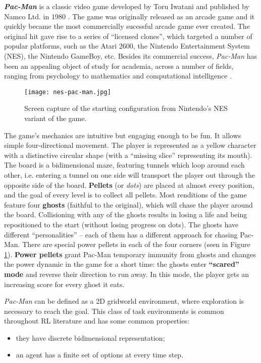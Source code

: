 \textbf{\textit{Pac-Man}} is a classic video game developed by Toru Iwatani and published by Namco Ltd. in 1980 \cite{pacman-in-academia}.
The game was originally released as an arcade game and it quickly became the most commercially sucessful arcade game ever created.
The original hit gave rise to a series of ``licensed clones'', which targeted a number of popular platforms, such as the Atari 2600, the Nintendo Entertainment System (NES), the Nintendo GameBoy, etc.
Besides its commercial success, \emph{Pac-Man} has been an appealing object of study for academia, across a number of fields, ranging from psychology to mathematics and computational intelligence \cite{pacman-in-academia}.

\begin{figure}[h]
    \centering
    \texttt{[image: nes-pac-man.jpg]}
    \caption{Screen capture of the starting configuration from Nintendo's NES variant of the game.}
    \label{fig:pac-man-screen}
\end{figure}

The game's mechanics are intuitive but engaging enough to be fun.
It allows simple four-directional movement.
The player is represented as a yellow character with a distinctive circular shape (with a ``missing slice''\footnotemark{} representing its mouth).
The board is a bidimensional maze, featuring tunnels which loop around each other, i.e. entering a tunnel on one side will transport the player out through the opposite side of the board.
\textbf{Pellets} (or \emph{dots}) are placed at almost every position, and the goal of every level is to collect all pellets.
Most renditions of the game feature four \textbf{ghosts} (faithful to the original), which will chase the player around the board.
Collisioning with any of the ghosts results in losing a life and being repositioned to the start (without losing progress on dots).
The ghosts have different ``personalities'' -- each of them has a different approach for chasing Pac-Man.
There are special power pellets in each of the four corners (seen in Figure \ref{fig:pac-man-screen}).
\textbf{Power pellets} grant Pac-Man temporary immunity from ghosts and changes the power dynamic in the game for a short time: the ghosts enter \textbf{``scared'' mode} and reverse their direction to run away.
In this mode, the player gets an increasing score for every ghost it eats.

\emph{Pac-Man} can be defined as a 2D gridworld environment, where exploration is necessary to reach the goal.
This class of task environments is common throughout RL literature and has some common properties:
\begin{itemize}
    \item they have discrete bidimensional representation;
    \item an agent has a finite set of options at every time step.
\end{itemize}

